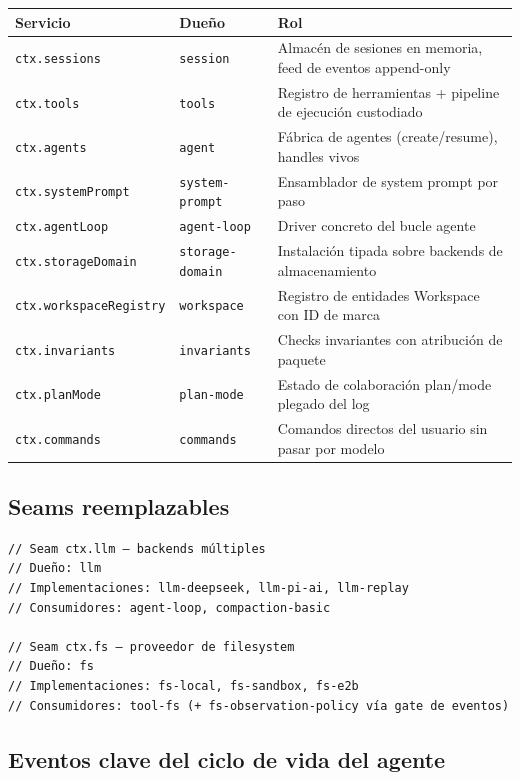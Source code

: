 \documentclass[11pt,a4paper]{article}
\begin{document}
\begin{center}
\begin{tabular}{@{}lll@{}}
\toprule
Servicio & Dueño & Rol \\
\midrule
\texttt{ctx.sessions} & \texttt{session} & Almacén de sesiones en memoria, feed de eventos append-only \\
\texttt{ctx.tools} & \texttt{tools} & Registro de herramientas + pipeline de ejecución custodiado \\
\texttt{ctx.agents} & \texttt{agent} & Fábrica de agentes (create/resume), handles vivos \\
\texttt{ctx.systemPrompt} & \texttt{system-prompt} & Ensamblador de system prompt por paso \\
\texttt{ctx.agentLoop} & \texttt{agent-loop} & Driver concreto del bucle agente \\
\texttt{ctx.storageDomain} & \texttt{storage-domain} & Instalación tipada sobre backends de almacenamiento \\
\texttt{ctx.workspaceRegistry} & \texttt{workspace} & Registro de entidades Workspace con ID de marca \\
\texttt{ctx.invariants} & \texttt{invariants} & Checks invariantes con atribución de paquete \\
\texttt{ctx.planMode} & \texttt{plan-mode} & Estado de colaboración plan/mode plegado del log \\
\texttt{ctx.commands} & \texttt{commands} & Comandos directos del usuario sin pasar por modelo \\
\bottomrule
\end{tabular}
\end{center}



\subsection*{Seams reemplazables}


\begin{lstlisting}
// Seam ctx.llm — backends múltiples
// Dueño: llm
// Implementaciones: llm-deepseek, llm-pi-ai, llm-replay
// Consumidores: agent-loop, compaction-basic

// Seam ctx.fs — proveedor de filesystem
// Dueño: fs
// Implementaciones: fs-local, fs-sandbox, fs-e2b
// Consumidores: tool-fs (+ fs-observation-policy vía gate de eventos)
\end{lstlisting}


\subsection*{Eventos clave del ciclo de vida del agente}
\end{document}
